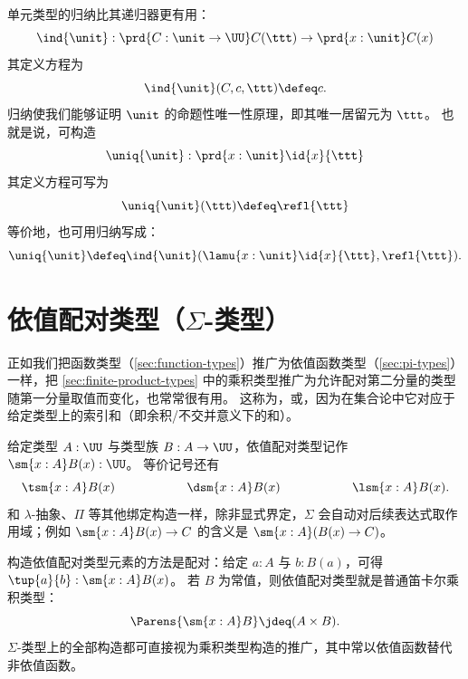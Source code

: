 
单元类型的归纳比其递归器更有用： 
%
\[ \ind{\unit} : \prd{C:\unit \to \UU} C(\ttt) \to \prd{x:\unit}C(x)\]
其定义方程为
\[ \ind{\unit}(C,c,\ttt) \defeq c. \]
归纳使我们能够证明 $\unit$ 的命题性唯一性原理，即其唯一居留元为 $\ttt$。
也就是说，可构造
\label{uniquenessunit}
\[\uniq{\unit} : \prd{x:\unit} \id{x}{\ttt} \]
其定义方程可写为
\[\uniq{\unit}(\ttt) \defeq \refl{\ttt} \]
等价地，也可用归纳写成：
\[\uniq{\unit} \defeq \ind{\unit}(\lamu{x:\unit} \id{x}{\ttt},\refl{\ttt}). \]

%
%

\section{依值配对类型（\texorpdfstring{$\Sigma$}{Σ}-类型）}
\label{sec:sigma-types}

%
%
%
%
%

正如我们把函数类型（\cref{sec:function-types}）推广为依值函数类型（\cref{sec:pi-types}）一样，把 \cref{sec:finite-product-types} 中的乘积类型推广为允许配对第二分量的类型随第一分量取值而变化，也常常很有用。
这称为，或，因为在集合论中它对应于给定类型上的索引和（即余积/不交并意义下的和）。

给定类型 $A:\UU$ 与类型族 $B : A \to \UU$，依值配对类型记作 $\sm{x:A} B(x) : \UU$。
等价记号还有
\[ \tsm{x:A} B(x) \hspace{2cm} \dsm{x:A}B(x) \hspace{2cm} \lsm{x:A} B(x). \]
和 $\lambda$-抽象、$\Pi$ 等其他绑定构造一样，除非显式界定，$\Sigma$ 会自动对后续表达式取作用域；例如 $\sm{x:A} B(x) \to C$ 的含义是 $\sm{x:A} (B(x) \to C)$。

%
%
构造依值配对类型元素的方法是配对：给定 $a:A$ 与 $b:B(a)$，可得
$\tup{a}{b} : \sm{x:A} B(x)$。
若 $B$ 为常值，则依值配对类型就是普通笛卡尔乘积类型：
\[ \Parens{\sm{x:A} B} \jdeq (A \times B).\]
$\Sigma$-类型上的全部构造都可直接视为乘积类型构造的推广，其中常以依值函数替代非依值函数。

